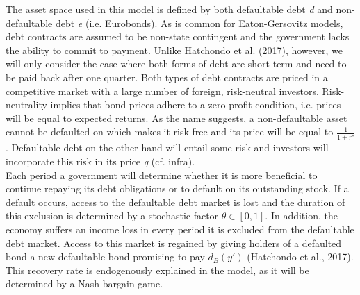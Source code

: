 The asset space used in this model is defined by both defaultable debt \textit{d} and non-defaultable debt \textit{e} (i.e. Eurobonds). As is common for Eaton-Gersovitz models, debt contracts are assumed to be non-state contingent and the government lacks the ability to commit to payment. Unlike Hatchondo et al. (2017), however, we will only consider the case where both forms of debt are short-term and need to be paid back after one quarter. Both types of debt contracts are priced in a competitive market with a large number of foreign, risk-neutral investors. Risk-neutrality implies that bond prices adhere to a zero-profit condition, i.e. prices will be equal to expected returns. As the name suggests, a non-defaultable asset cannot be defaulted on which makes it risk-free and its price will be equal to $\frac{1}{1+r^*}$. Defaultable debt on the other hand will entail some risk and investors will incorporate this risk in its price \textit{q} (cf. infra).\\

Each period a government will determine whether it is more beneficial to continue repaying its debt obligations or to default on its outstanding stock. If a default occurs, access to the defaultable debt market is lost and the duration of this exclusion is determined by a stochastic factor $\theta \in \left[0,1\right]$. In addition, the economy suffers an income loss in every period it is excluded from the defaultable debt market. Access to this market is regained by giving holders of a defaulted bond a new defaultable bond promising to pay $d_B(y')$ (Hatchondo et al., 2017). This recovery rate is endogenously explained in the model, as it will be determined by a Nash-bargain game.\\

